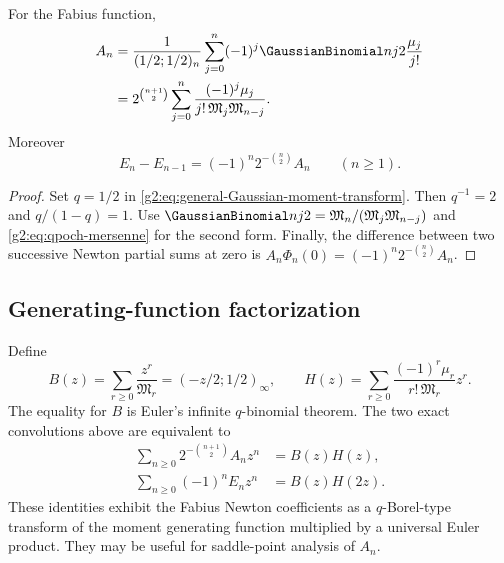 \begin{corollary}
\label{g2:cor:dyadic-moment-transform}
For the Fabius function,
\begin{align}
 A_n
 &=\frac1{(1/2;1/2)_n}
 \sum_{j=0}^n(-1)^j\GaussianBinomial nj2\frac{\mu_j}{j!}
 \label{g2:eq:fabius-Gaussian-transform}\\
 &=2^{\binom{n+1}{2}}
 \sum_{j=0}^n
 \frac{(-1)^j\mu_j}
 {j!\,\mathfrak M_j\mathfrak M_{n-j}}.
 \label{g2:eq:fabius-Mersenne-transform}
\end{align}
Moreover
\begin{equation}
 E_n-E_{n-1}=(-1)^n2^{-\binom n2}A_n
 \qquad(n\ge1).
 \label{g2:eq:endpoint-increment}
\end{equation}
\end{corollary}

\begin{proof}
Set $q=1/2$ in \eqref{g2:eq:general-Gaussian-moment-transform}.  Then
$q^{-1}=2$ and $q/(1-q)=1$.  Use
\(
 \GaussianBinomial nj2=\mathfrak M_n/(\mathfrak M_j\mathfrak M_{n-j})
\)
and \eqref{g2:eq:qpoch-mersenne} for the second form.  Finally, the difference
between two successive Newton partial sums at zero is
$A_n\Phi_n(0)=(-1)^n2^{-\binom n2}A_n$.
\end{proof}

\subsection{Generating-function factorization}

Define
\begin{equation}
 B(z)=\sum_{r\ge0}\frac{z^r}{\mathfrak M_r}
 =(-z/2;1/2)_\infty,
 \qquad
 H(z)=\sum_{r\ge0}\frac{(-1)^r\mu_r}{r!\,\mathfrak M_r}z^r.
 \label{g2:eq:BH-generating}
\end{equation}
The equality for $B$ is Euler's infinite $q$-binomial theorem.  The two exact
convolutions above are equivalent to
\begin{align}
 \sum_{n\ge0}2^{-\binom{n+1}{2}}A_nz^n
 &=B(z)H(z),
 \label{g2:eq:newton-generating-factorization}\\
 \sum_{n\ge0}(-1)^nE_nz^n
 &=B(z)H(2z).
 \label{g2:eq:endpoint-generating-factorization}
\end{align}
These identities exhibit the Fabius Newton coefficients as a $q$-Borel-type
transform of the moment generating function multiplied by a universal Euler
product.  They may be useful for saddle-point analysis of $A_n$.

